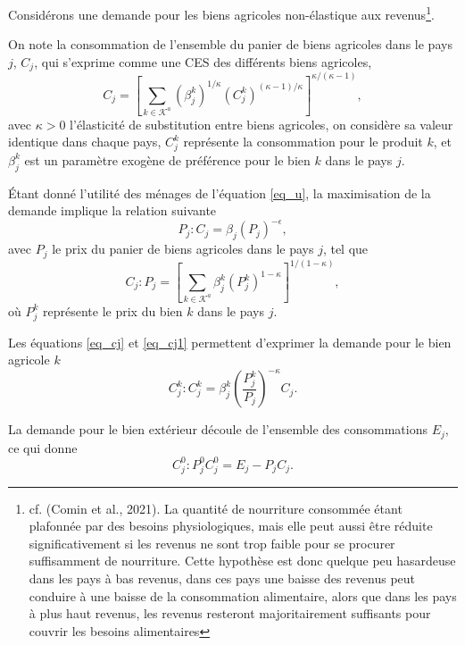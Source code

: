 Considérons une demande pour les biens agricoles non-élastique aux revenus\footnote{cf. (Comin et al., 2021).  La quantité de nourriture consommée étant plafonnée par des besoins physiologiques, mais elle peut aussi être réduite significativement si les revenus ne sont trop faible pour se procurer suffisamment de nourriture. Cette hypothèse est donc quelque peu hasardeuse dans les pays à bas revenus, dans ces pays une baisse des revenus peut conduire à une baisse de la consommation alimentaire, alors que dans les pays à plus haut revenus, les revenus resteront majoritairement suffisants pour couvrir les besoins alimentaires}.

On note la consommation de l’ensemble du panier de biens agricoles dans le pays $j$, $C_j$, qui s’exprime comme une CES des différents biens agricoles,
\begin{equation}\label{eq_cj1}
	C_j = \left[ \sum_{k \in \mathcal{K}^a} (\beta_{j}^k)^{1/\kappa} (C_{j}^k)^{(\kappa-1)/\kappa} \right]^{\kappa/(\kappa-1)},
\end{equation}
avec $\kappa > 0$ l’élasticité de substitution entre biens agricoles, on considère sa valeur identique dans chaque pays, $C_j^k$ représente la consommation pour le produit $k$, et $\beta_{j}^k$ est un paramètre exogène de préférence pour le bien $k$ dans le pays $j$.

Étant donné l’utilité des ménages de l’équation \ref{eq_u}, la maximisation de la demande implique la relation suivante
\begin{equation}\label{eq_pj}
	P_j: C_j = \beta_j (P_j)^{-\epsilon},
\end{equation}
avec $P_j$ le prix du panier de biens agricoles dans le pays $j$, tel que
\begin{equation}\label{eq_cj}
	C_j: P_j = \left[ \sum_{k \in \mathcal{K}^a} \beta_{j}^k (P_{j}^k)^{1-\kappa} \right]^{1/(1-\kappa)},
\end{equation}
où $P_j^k$ représente le prix du bien $k$ dans le pays $j$.

Les équations \ref{eq_cj} et \ref{eq_cj1} permettent d’exprimer la demande pour le bien agricole $k$
\begin{equation}
	C_j^k: C_j^k = \beta_j^k \left(\frac{P_j^k}{P_j} \right)^{-\kappa} C_j.
\end{equation}

La demande pour le bien extérieur découle de l’ensemble des consommations $E_j$, ce qui donne
\begin{equation}
	C_j^0 : P_j^0 C_j^0 = E_j - P_jC_j.
\end{equation}


